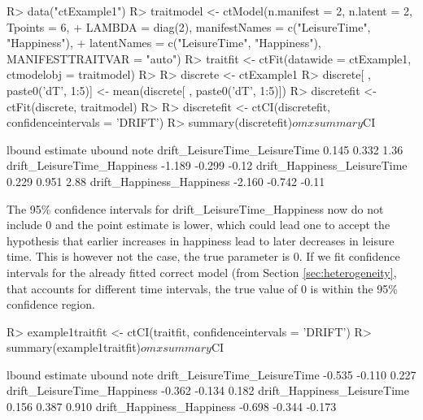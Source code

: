 \documentclass[nojss]{jss}\usepackage[]{graphicx}\usepackage[]{color}
\begin{document}
\begin{Schunk}
\begin{Sinput}
R> data("ctExample1")
R> traitmodel <- ctModel(n.manifest = 2, n.latent = 2, Tpoints = 6, 
+   LAMBDA = diag(2), manifestNames = c("LeisureTime", "Happiness"), 
+   latentNames = c("LeisureTime", "Happiness"), MANIFESTTRAITVAR = "auto")
R> traitfit <- ctFit(datawide = ctExample1, ctmodelobj = traitmodel)
R> 
R> discrete <- ctExample1
R> discrete[ , paste0('dT', 1:5)] <- mean(discrete[ , paste0('dT', 1:5)])
R> discretefit <- ctFit(discrete, traitmodel)
R> 
R> discretefit <- ctCI(discretefit, confidenceintervals = 'DRIFT')
R> summary(discretefit)$omxsummary$CI
\end{Sinput}
\begin{Soutput}
                              lbound estimate ubound note
drift_LeisureTime_LeisureTime  0.145    0.332   1.36     
drift_LeisureTime_Happiness   -1.189   -0.299  -0.12     
drift_Happiness_LeisureTime    0.229    0.951   2.88     
drift_Happiness_Happiness     -2.160   -0.742  -0.11     
\end{Soutput}
\end{Schunk}

The 95\% confidence intervals for drift\_LeisureTime\_Happiness now do not include 0 and the point estimate is lower, which could lead one to accept the hypothesis that earlier increases in happiness lead to later decreases in leisure time. This is however not the case, the true parameter is 0. If we fit confidence intervals for the already fitted correct model (from Section \ref{sec:heterogeneity}, that accounts for different time intervals, the true value of 0 is within the 95\% confidence region.

\begin{Schunk}
\begin{Sinput}
R> example1traitfit <- ctCI(traitfit, confidenceintervals = 'DRIFT')
R> summary(example1traitfit)$omxsummary$CI
\end{Sinput}
\begin{Soutput}
                              lbound estimate ubound note
drift_LeisureTime_LeisureTime -0.535   -0.110  0.227     
drift_LeisureTime_Happiness   -0.362   -0.134  0.182     
drift_Happiness_LeisureTime    0.156    0.387  0.910     
drift_Happiness_Happiness     -0.698   -0.344 -0.173     
\end{Soutput}
\end{Schunk}

\newpage
\end{document}
